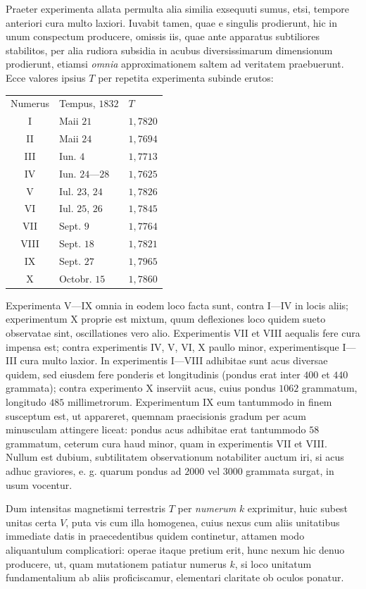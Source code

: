 Praeter experimenta allata permulta alia similia exsequuti sumus, etsi, tempore anteriori cura multo laxiori. Iuvabit tamen, quae e singulis prodierunt, hic in unum conspectum producere, omissis iis, quae ante apparatus subtiliores stabilitos, per alia rudiora subsidia in acubus diversissimarum dimensionum prodierunt, etiamsi \textit{omnia} approximationem saltem ad veritatem praebuerunt. Ecce valores ipsius $T$ per repetita experimenta subinde erutos:
\begin{center}
\begin{tabular}{c|l|l}
Numerus&Tempus, $1832$&$T$\\
I&Maii $21$&$1{,}7820$\\
II&Maii $24$&$1{,}7694$\\
III&Iun. $4$&$1{,}7713$\\
IV&Iun. $24$—$28$&$1{,}7625$\\
V&Iul. $23$, $24$&$1{,}7826$\\
VI&Iul. $25$, $26$&$1{,}7845$\\
VII&Sept. $9$&$1{,}7764$\\
VIII&Sept. $18$&$1{,}7821$\\
IX&Sept. $27$&$1{,}7965$\\
X&Octobr. $15$&$1{,}7860$
\end{tabular}
\end{center}
Experimenta V—IX omnia in eodem loco facta sunt, contra I—IV in locis aliis; experimentum X proprie est mixtum, quum deflexiones loco quidem sueto observatae sint, oscillationes vero alio. Experimentis VII et VIII aequalis fere cura impensa est; contra experimentis IV, V, VI, X paullo minor, experimentisque I—III cura multo laxior. In experimentis I—VIII adhibitae sunt acus diversae quidem, sed eiusdem fere ponderis et longitudinis (pondus erat inter $400$ et $440$ grammata); contra experimento X inserviit acus, cuius pondus $1062$ grammatum, longitudo $485$ millimetrorum. Experimentum IX eum tantummodo in finem susceptum est, ut appareret, quemnam praecisionis gradum per acum minusculam attingere liceat: pondus acus adhibitae erat tantummodo $58$ grammatum, ceterum cura haud minor, quam in experimentis VII et VIII. Nullum est dubium, subtilitatem observationum notabiliter auctum iri, si acus adhuc graviores, e. g. quarum pondus ad $2000$ vel $3000$ grammata surgat, in usum vocentur.

Dum intensitas magnetismi terrestris $T$ per \textit{numerum} $k$ exprimitur, huic subest unitas certa $V$, puta vis cum illa homogenea, cuius nexus cum aliis unitatibus immediate datis in praecedentibus quidem continetur, attamen modo aliquantulum complicatiori: operae itaque pretium erit, hunc nexum hic denuo producere, ut, quam mutationem patiatur numerus $k$, si loco unitatum fundamentalium ab aliis proficiscamur, elementari claritate ob oculos ponatur.

